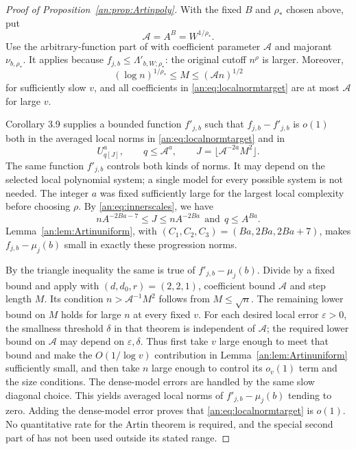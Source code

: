 \documentclass[11pt,reqno]{amsart}
\theoremstyle{definition}
\numberwithin{equation}{section}
\newcommand{\eps}{\varepsilon}
\def\t{\text}
\begin{document}
\begin{proof}[Proof of Proposition~\ref{an:prop:Artinpoly}]
With the fixed $B$ and $\rho_*$ chosen above, put
\[
 \mathcal A=A^B=W^{1/\rho_*}.
\]
Use the arbitrary-function part of \cite[Theorem 3.1 and Corollary 3.9]{TZpoly} with coefficient parameter $\mathcal A$ and majorant $\nu_{b,\rho_*}$. It applies because $f_{j,b}\le\Lambda'_{b,W;\rho_*}$: the original cutoff $n^\rho$ is larger. Moreover,
\[
 (\log n)^{1/\rho_*}\le M\le(\mathcal A n)^{1/2}
\]
for sufficiently slow $v$, and all coefficients in \eqref{an:eq:localnormtarget} are at most $\mathcal A$ for large $v$.

Corollary 3.9 supplies a bounded function $f'_{j,b}$ such that $f_{j,b}-f'_{j,b}$ is $o(1)$ both in the averaged local norms in \eqref{an:eq:localnormtarget} and in
\begin{equation}\label{an:eq:progressionscale}
 U^a_{q[J]},\qquad q\le\mathcal A^a,\qquad
 J=\lfloor\mathcal A^{-2a}M^2\rfloor.
\end{equation}
The same function $f'_{j,b}$ controls both kinds of norms. It may depend on the selected local polynomial system; a single model for every possible system is not needed. The integer $a$ was fixed sufficiently large for the largest local complexity before choosing $\rho$. By \eqref{an:eq:innerscales}, we have
\[
 nA^{-2Ba-7}\le J\le nA^{-2Ba}\ \ \t{and}\ \  q\le A^{Ba}.
\]
Lemma~\ref{an:lem:Artinuniform}, with $(C_1,C_2,C_3)=(Ba,2Ba,2Ba+7)$, makes $f_{j,b}-\mu_j(b)$ small in exactly these progression norms.

By the triangle inequality the same is true of $f'_{j,b}-\mu_j(b)$. Divide by a fixed bound and apply \cite[Theorem 2.5]{TZpoly} with $(d,d_0,r)=(2,2,1)$, coefficient bound $\mathcal A$ and step length $M$. Its condition $n>\mathcal A^{-1}M^2$ follows from $M\le\sqrt n$. The remaining lower bound on $M$ holds for large $n$ at every fixed $v$. For each desired local error $\eps>0$, the smallness threshold $\delta$ in that theorem is independent of $\mathcal A$; the required lower bound on $\mathcal A$ may depend on $\eps,\delta$. Thus first take $v$ large enough to meet that bound and make the $O(1/\log v)$ contribution in Lemma~\ref{an:lem:Artinuniform} sufficiently small, and then take $n$ large enough to control its $o_v(1)$ term and the size conditions. The dense-model errors are handled by the same slow diagonal choice. This yields averaged local norms of $f'_{j,b}-\mu_j(b)$ tending to zero. Adding the dense-model error proves that \eqref{an:eq:localnormtarget} is $o(1)$. No quantitative rate for the Artin theorem is required, and the special second part of \cite[Theorem 3.1]{TZpoly} has not been used outside its stated range.


\end{proof}
\end{document}
